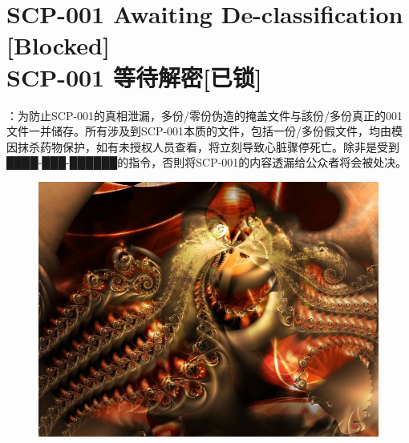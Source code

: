 \chapter[{SCP-001 等待解密[已锁]}]{
	SCP-001 Awaiting De-classification [Blocked] \\
	SCP-001 等待解密[已锁]
}

\label{chap:SCP-001.0}


\hr

\begin{scpboxbr}
：为防止SCP-001的真相泄漏，多份/零份伪造的掩盖文件与該份/多份真正的001文件一并储存。所有涉及到SCP-001本质的文件，包括一份/多份假文件，均由模因抹杀药物保护，如有未授权人员查看，将立刻导致心脏骤停死亡。除非是受到████-███-██████的指令，否則将SCP-001的内容透漏给公众者将会被处决。
\end{scpboxbr}

\hr


\hr

\clearpage

\begin{figure}[H]
	\centering
	\includegraphics[width=\textwidth]{images/SCP.001.0.jpg}
\end{figure}

